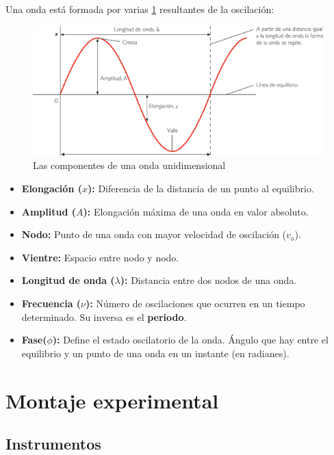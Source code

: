 \documentclass[fleqn,usenatbib,openbib]{mnras}
\begin{document}
 Una onda está formada por varias \underline{}\cref{fig:componentes} resultantes de la oscilación:
 
 \begin{figure}
    \centering
    \includegraphics[width=\columnwidth]{componentes.png}
    \caption{Las componentes de una onda unidimensional \protect\cite{onda}}
    \label{fig:componentes}
    \end{figure}
 \begin{itemize}

\item \textbf{Elongación ($x$):} Diferencia de la distancia de un punto al equilibrio.
\item \textbf{Amplitud ($A$):} Elongación máxima de una onda en valor absoluto. 
\item \textbf{Nodo:} Punto de una onda con mayor velocidad de oscilación ($v_o$).
\item \textbf{Vientre:} Espacio entre nodo y nodo.
\item \textbf{Longitud de onda ($\lambda$):} Distancia entre dos nodos de una onda.
\item \textbf{Frecuencia ($\nu$):} Número de oscilaciones que ocurren en un tiempo determinado. Su inversa es el \textbf{periodo}.
\item \textbf{Fase($\phi$):} Define el estado oscilatorio de la onda. Ángulo que hay entre el equilibrio y un punto de una onda en un instante (en radianes).

 \end{itemize}

\section{Montaje experimental}

\subsection{Instrumentos}
\end{document}
